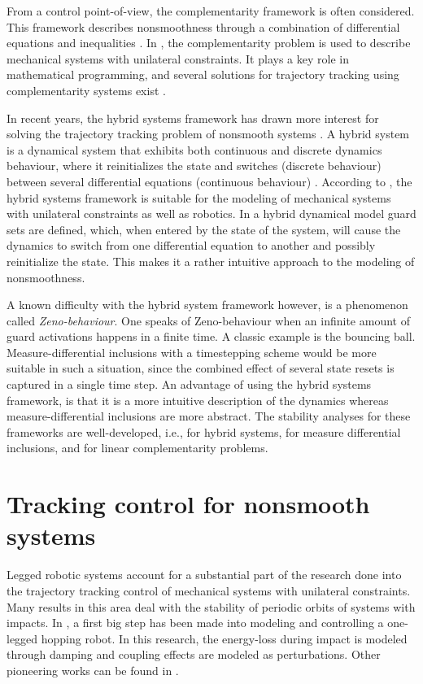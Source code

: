 \documentclass[../DC2017114Bouma.tex]{subfiles}
\begin{document}
From a control point-of-view, the complementarity framework is often considered. This framework describes nonsmoothness through a combination of differential equations and inequalities \cite{VanDerSchaft1998,Heemels1999}. In \cite{Glocker2001}, the complementarity problem is used to describe mechanical systems with unilateral constraints. It plays a key role in mathematical programming, and several solutions for trajectory tracking using complementarity systems exist \cite{Bourgeot2005,Morarescu2010}. 

In recent years, the hybrid systems framework has drawn more interest for solving the trajectory tracking problem of nonsmooth systems \cite{Hyun2014,Morris2009}. A hybrid system is a dynamical system that exhibits both continuous and discrete dynamics behaviour, where it reinitializes the state and switches (discrete behaviour) between several differential equations (continuous behaviour) \cite{Goebel2009}. According to \cite{Ding2011a}, the hybrid systems framework is suitable for the modeling of mechanical systems with unilateral constraints as well as robotics. In a hybrid dynamical model guard sets are defined, which, when entered by the state of the system, will cause the dynamics to switch from one differential equation to another and possibly reinitialize the state. This makes it a rather intuitive approach to the modeling of nonsmoothness. 

A known difficulty with the hybrid system framework however, is a phenomenon called \textit{Zeno-behaviour}. One speaks of Zeno-behaviour when an infinite amount of guard activations happens in a finite time. A classic example is the bouncing ball. Measure-differential inclusions with a timestepping scheme would be more suitable in such a situation, since the combined effect of several state resets is captured in a single time step. An advantage of using the hybrid systems framework, is that it is a more intuitive description of the dynamics whereas measure-differential inclusions are more abstract. The stability analyses for these frameworks are well-developed, i.e., \cite{Ye1998,Lygeros2003,Goebel2009} for hybrid systems, \cite{Pereira2004,Brogliato2004,Leine2008} for measure differential inclusions, and \cite{Brogliato1999,Camlibel2006,Camlibel2007} for linear complementarity problems.

\section{Tracking control for nonsmooth systems}
Legged robotic systems account for a substantial part of the research done into the trajectory tracking control of mechanical systems with unilateral constraints. Many results in this area deal with the stability of periodic orbits of systems with impacts. In \cite{Raibert1984}, a first big step has been made into modeling and controlling a one-legged hopping robot. In this research, the energy-loss during impact is modeled through damping and coupling effects are modeled as perturbations. Other pioneering works can be found in \cite{Lebaudy1993,Michalska1996,Gregorio1997}. 
\end{document}
